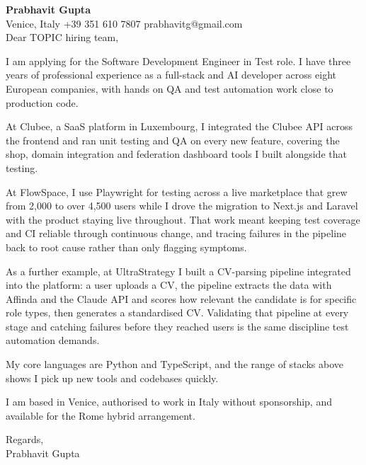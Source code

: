 \documentclass[a4paper,10.5pt]{article}
\begin{document}
\textbf{Prabhavit Gupta}\\
Venice, Italy \textbar{} +39 351 610 7807 \textbar{} prabhavitg@gmail.com\\[10pt]
Dear TOPIC hiring team,

I am applying for the Software Development Engineer in Test role. I have three years of professional experience as a full-stack and AI developer across eight European companies, with hands on QA and test automation work close to production code.

At Clubee, a SaaS platform in Luxembourg, I integrated the Clubee API across the frontend and ran unit testing and QA on every new feature, covering the shop, domain integration and federation dashboard tools I built alongside that testing.

At FlowSpace, I use Playwright for testing across a live marketplace that grew from 2,000 to over 4,500 users while I drove the migration to Next.js and Laravel with the product staying live throughout. That work meant keeping test coverage and CI reliable through continuous change, and tracing failures in the pipeline back to root cause rather than only flagging symptoms.

As a further example, at UltraStrategy I built a CV-parsing pipeline integrated into the platform: a user uploads a CV, the pipeline extracts the data with Affinda and the Claude API and scores how relevant the candidate is for specific role types, then generates a standardised CV. Validating that pipeline at every stage and catching failures before they reached users is the same discipline test automation demands.

My core languages are Python and TypeScript, and the range of stacks above shows I pick up new tools and codebases quickly.

I am based in Venice, authorised to work in Italy without sponsorship, and available for the Rome hybrid arrangement.

Regards,\\
Prabhavit Gupta
\end{document}
